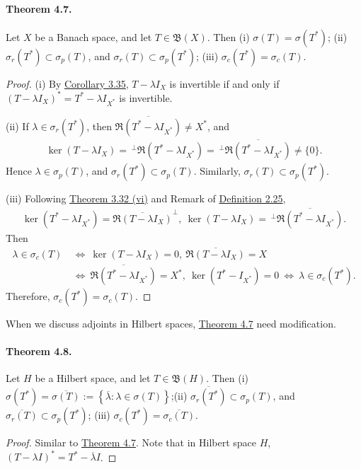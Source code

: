 \documentclass{article}
\begin{document}
\paragraph{Theorem 4.7.\label{thm:4.7}} Let $X$ be a Banach space, and let $T\in\mathfrak{B}(X)$. Then (i) $\sigma(T)=\sigma(T^*)$; (ii) $\sigma_r(T^*)\subset\sigma_p(T)$, and $\sigma_r(T)\subset\sigma_p(T^*)$; (iii) $\sigma_c(T^*)=\sigma_c(T)$.
\begin{proof}
(i) By \hyperref[cor:3.35]{Corollary 3.35}, $T-\lambda I_X$ is invertible if and only if $(T-\lambda I_X)^*=T^*-\lambda I_{X^*}$ is invertible.
\vspace{0.1cm}

(ii) If $\lambda\in\sigma_r(T^*)$, then $\overline{\mathfrak{R}(T^*-\lambda I_{X^*})}\neq X^*$, and \begin{align*}
	\ker(T-\lambda I_X) =\, ^\perp\mathfrak{R}(T^*-\lambda I_{X^*})=\, ^\perp\overline{\mathfrak{R}(T^*-\lambda I_{X^*})} \neq \{0\}.
\end{align*}
Hence $\lambda\in\sigma_p(T)$, and $\sigma_r(T^*)\subset\sigma_p(T)$. Similarly, $\sigma_r(T)\subset\sigma_p(T^*)$.

(iii) Following \hyperref[thm:3.32]{Theorem 3.32 (vi)} and Remark of \hyperref[def:2.25]{Definition 2.25},
\begin{align*}
	\ker(T^*-\lambda I_{X^*})=\overline{\mathfrak{R}(T-\lambda I_X)}^\perp,\ \ker(T-\lambda I_X)=\,^\perp\overline{\mathfrak{R}(T^*-\lambda I_{X^*})}.
\end{align*}
Then
\begin{align*}
	\lambda\in\sigma_c(T)\ &\Leftrightarrow\ \ker(T-\lambda I_X)=0,\ \overline{\mathfrak{R}(T-\lambda I_X)}=X\\
	&\Leftrightarrow\ \overline{\mathfrak{R}(T^*-\lambda I_{X^*})}=X^*,\ \ker(T^*-I_{X^*})=0\ \Leftrightarrow\ \lambda\in\sigma_c(T^*).
\end{align*}
Therefore, $\sigma_c(T^*)=\sigma_c(T)$.
\end{proof}

When we discuss adjoints in Hilbert spaces, \hyperref[thm:4.7]{Theorem 4.7} need modification. 

\paragraph{Theorem 4.8.\label{thm:4.8}} Let $H$ be a Hilbert space, and let $T\in\mathfrak{B}(H)$. Then (i) $\sigma(T^*)=\overline{\sigma(T)}:=\left\{\overline{\lambda}:\lambda\in\sigma(T)\right\}$;\quad (ii) $\overline{\sigma_r(T^*)}\subset\sigma_p(T)$, and $\overline{\sigma_r(T)}\subset\sigma_p(T^*)$; (iii) $\sigma_c(T^*)=\overline{\sigma_c(T)}$.
\begin{proof}
	Similar to \hyperref[thm:4.7]{Theorem 4.7}. Note that in Hilbert space $H$, $(T-\lambda I)^* = T^* - \overline{\lambda}I$.
\end{proof}
\end{document}
